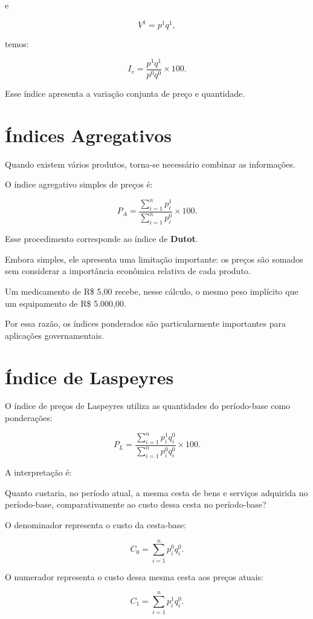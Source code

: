 e

$$
V^1=p^1q^1,
$$

temos:

$$
I_v=
\frac{p^1q^1}{p^0q^0}\times100.
$$

Esse índice apresenta a variação conjunta de preço e quantidade.


\section{Índices Agregativos}

Quando existem vários produtos, torna-se necessário combinar as informações.

O índice agregativo simples de preços é:

$$
P_A=
\frac{\sum_{i=1}^{n}p_i^1}
{\sum_{i=1}^{n}p_i^0}\times100.
$$

Esse procedimento corresponde ao índice de \textbf{Dutot}.\vskip0.3cm

Embora simples, ele apresenta uma limitação importante: os preços são somados sem considerar a importância econômica relativa de cada produto. \vskip0.3cm

Um medicamento de R\$ 5,00 recebe, nesse cálculo, o mesmo peso implícito que um equipamento de R\$ 5.000,00. \vskip0.3cm

Por essa razão, os índices ponderados são particularmente importantes para aplicações governamentais.



\section{Índice de Laspeyres}


O índice de preços de Laspeyres utiliza as quantidades do período-base como ponderações:

$$
P_L=
\frac{\sum_{i=1}^{n}p_i^1q_i^0}
{\sum_{i=1}^{n}p_i^0q_i^0}
\times100.
$$

A interpretação é:

Quanto custaria, no período atual, a mesma cesta de bens e serviços adquirida no período-base, comparativamente ao custo dessa cesta no período-base?

O denominador representa o custo da cesta-base:

$$
C_0=
\sum_{i=1}^{n}p_i^0q_i^0.
$$

O numerador representa o custo dessa mesma cesta aos preços atuais:

$$
C_1=
\sum_{i=1}^{n}p_i^1q_i^0.
$$

